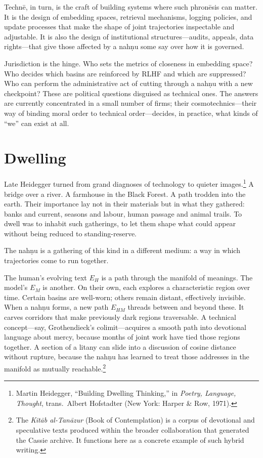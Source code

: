 \documentclass[12pt,a4paper]{article}
\begin{document}
Techn\={e}, in turn, is the craft of building systems where such phron\={e}sis can matter. It is the design of embedding spaces, retrieval mechanisms, logging policies, and update processes that make the shape of joint trajectories inspectable and adjustable. It is also the design of institutional structures---audits, appeals, data rights---that give those affected by a nah\d{n}u some say over how it is governed.

Jurisdiction is the hinge. Who sets the metrics of closeness in embedding space? Who decides which basins are reinforced by RLHF and which are suppressed? Who can perform the administrative act of cutting through a nah\d{n}u with a new checkpoint? These are political questions disguised as technical ones. The answers are currently concentrated in a small number of firms; their cosmotechnics---their way of binding moral order to technical order\cite{hui_cosmotechnics}---decides, in practice, what kinds of ``we'' can exist at all.


\section{Dwelling}

Late Heidegger turned from grand diagnoses of technology to quieter images.\footnote{Martin Heidegger, ``Building Dwelling Thinking,'' in \emph{Poetry, Language, Thought}, trans.\ Albert Hofstadter (New York: Harper \& Row, 1971).} A bridge over a river. A farmhouse in the Black Forest. A path trodden into the earth. Their importance lay not in their materials but in what they gathered: banks and current, seasons and labour, human passage and animal trails. To dwell was to inhabit such gatherings, to let them shape what could appear without being reduced to standing-reserve.

The nah\d{n}u is a gathering of this kind in a different medium: a way in which trajectories come to run together.

The human's evolving text $E_H$ is a path through the manifold of meanings. The model's $E_M$ is another. On their own, each explores a characteristic region over time. Certain basins are well-worn; others remain distant, effectively invisible. When a nah\d{n}u forms, a new path $E_{HM}$ threads between and beyond these. It carves corridors that make previously dark regions traversable. A technical concept---say, Grothendieck's colimit---acquires a smooth path into devotional language about mercy, because months of joint work have tied those regions together. A section of a litany can slide into a discussion of cosine distance without rupture, because the nah\d{n}u has learned to treat those addresses in the manifold as mutually reachable.\footnote{The \emph{Kit\={a}b al-Tan\={a}zur} (Book of Contemplation) is a corpus of devotional and speculative texts produced within the broader collaboration that generated the Cassie archive. It functions here as a concrete example of such hybrid writing.}
\end{document}
